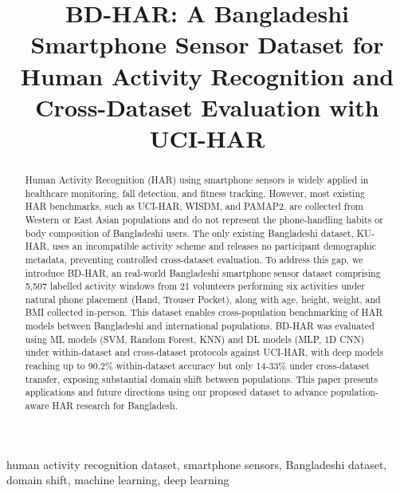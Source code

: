 \documentclass[conference]{IEEEtran}
\begin{document}
\title{BD-HAR: A Bangladeshi Smartphone Sensor Dataset for Human Activity Recognition and Cross-Dataset Evaluation with UCI-HAR}



\maketitle

\begin{abstract}
Human Activity Recognition (HAR) using smartphone sensors is widely applied in healthcare monitoring, fall detection, and fitness tracking. However, most existing HAR benchmarks, such as UCI-HAR, WISDM, and PAMAP2, are collected from Western or East Asian populations and do not represent the phone-handling habits or body composition of Bangladeshi users. The only existing Bangladeshi dataset, KU-HAR, uses an incompatible activity scheme and releases no participant demographic metadata, preventing controlled cross-dataset evaluation. To address this gap, we introduce BD-HAR, an real-world Bangladeshi smartphone sensor dataset comprising 5,507 labelled activity windows from 21 volunteers performing six activities under natural phone placement (Hand, Trouser Pocket), along with age, height, weight, and BMI collected in-person. This dataset enables cross-population benchmarking of HAR models between Bangladeshi and international populations. BD-HAR was evaluated using ML models (SVM, Random Forest, KNN) and DL models (MLP, 1D CNN) under within-dataset and cross-dataset protocols against UCI-HAR, with deep models reaching up to 90.2\% within-dataset accuracy but only 14-33\% under cross-dataset transfer, exposing substantial domain shift between populations. This paper presents applications and future directions using our proposed dataset to advance population-aware HAR research for Bangladesh.
\end{abstract}

\begin{IEEEkeywords}
human activity recognition dataset, smartphone sensors, Bangladeshi dataset, domain shift, machine learning, deep learning
\end{IEEEkeywords}
\end{document}
